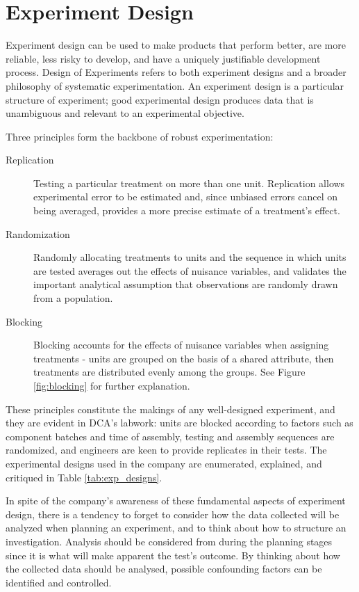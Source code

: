 \documentclass[11pt,a4paper,article]{memoir} %
\begin{document}
\section{Experiment Design}
Experiment design can be used to make products that perform better, are more reliable, less risky to develop, and have a uniquely justifiable development process. Design of Experiments refers to both experiment designs and a broader philosophy of systematic experimentation. An experiment design is a particular structure of experiment; good experimental design produces data that is unambiguous and relevant to an experimental objective.
\par
Three principles form the backbone of robust experimentation:
\begin{description}
\item[Replication]{Testing a particular treatment on more than one unit. Replication allows experimental error to be estimated and, since unbiased errors cancel on being averaged, provides a more precise estimate of a treatment's effect.}
\item[Randomization]{Randomly allocating treatments to units and the sequence in which units are tested averages out the effects of nuisance variables, and validates the important analytical assumption that observations are randomly drawn from a population.}
\item[Blocking]{Blocking accounts for the effects of nuisance variables when assigning treatments - units are grouped on the basis of a shared attribute, then treatments are distributed evenly among the groups. See Figure \ref{fig:blocking} for further explanation.}
\end{description}
These principles constitute the makings of any well-designed experiment, and they are evident in DCA's labwork: units are blocked according to factors such as component batches and time of assembly, testing and assembly sequences are randomized, and engineers are keen to provide replicates in their tests. The experimental designs used in the company are enumerated, explained, and critiqued in Table \ref{tab:exp_designs}.
\par
In spite of the company's awareness of these fundamental aspects of experiment design, there is a tendency to forget to consider how the data collected will be analyzed when planning an experiment, and to think about how to structure an investigation. Analysis should be considered from during the planning stages since it is what will make apparent the test's outcome. By thinking about how the collected data should be analysed, possible confounding factors can be identified and controlled.
\end{document}
